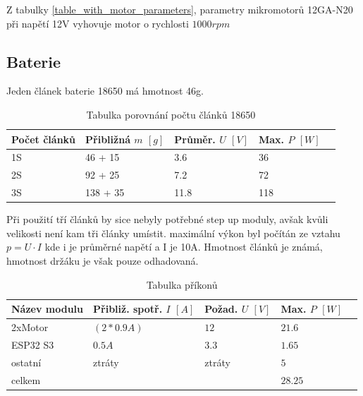 Z tabulky \ref{table_with_motor_parameters}, parametry mikromotorů 12GA-N20 při napětí 12V vyhovuje motor o rychlosti $1000rpm$

\subsection{Baterie}
Jeden článek baterie 18650 má hmotnost 46g.

\begin{table}[htbp!]
	\centering
	\begin{tabularx}{\textwidth}{|X|X|X|X|X|}\hline
		Počet článků & Přibližná $m$ $\left[g\right]$ & Průměr. $U$ $\left[ V \right]$ & Max. $P$ $\left[ W \right]$ \\ \hline
		1S           & 46 + 15                        & 3.6                            & 36                          \\ \hline
		2S           & 92 + 25                        & 7.2                            & 72                          \\ \hline
		3S           & 138 + 35                       & 11.8                           & 118                         \\ \hline
	\end{tabularx}
	\label{tab:tabulka 18650}
	\caption{Tabulka porovnání počtu článků 18650}
\end{table}
Při použití tří článků by sice nebyly potřebné step up moduly, avšak kvůli velikosti není kam tři články umístit.
maximální výkon byl počítán ze vztahu $p=U \cdot I$ kde i je průměrné napětí a I je 10A.
Hmotnost článků je známá, hmotnost držáku je však pouze odhadovaná.
\newline

\begin{table}[htbp!]
	\centering
	\begin{tabularx}{\textwidth}{|X|X|X|X|X|}\hline
		Název modulu & Přibliž. spotř. $I$ $\left[A\right]$ & Požad. $U$ $\left[ V \right]$ & Max. $P$ $\left[ W \right]$ \\ \hline
		2xMotor      & $(2*0.9A)$                           & $12$                          & $21.6$                      \\ \hline
		ESP32 S3     & $0.5A$                               & $3.3$                         & $1.65$                      \\ \hline
		ostatní      & ztráty                               & ztráty                        & $5$                         \\ \hline
		celkem       & ~                                    & ~                             & $28.25$                     \\ \hline
	\end{tabularx}
	\label{tab:tabulka_prikonnu}
	\caption{Tabulka příkonů}
\end{table}

